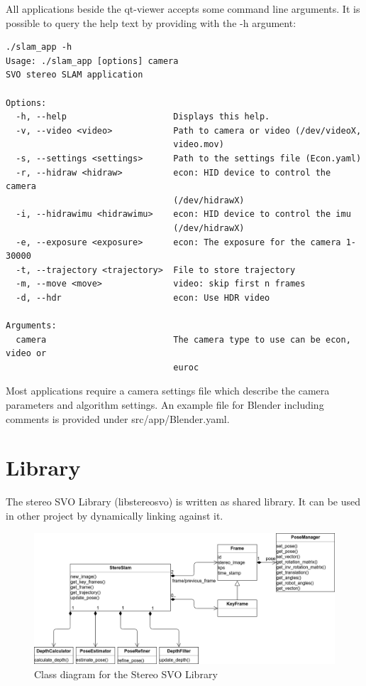 \documentclass[11pt,a4paper,titlepage,oneside]{report}
\begin{document}
All applications beside the qt-viewer accepts some command line arguments. It is possible to query the help text by providing with the -h argument:\\
\begin{lstlisting}
./slam_app -h
Usage: ./slam_app [options] camera
SVO stereo SLAM application

Options:
  -h, --help                     Displays this help.
  -v, --video <video>            Path to camera or video (/dev/videoX,
                                 video.mov)
  -s, --settings <settings>      Path to the settings file (Econ.yaml)
  -r, --hidraw <hidraw>          econ: HID device to control the camera
                                 (/dev/hidrawX)
  -i, --hidrawimu <hidrawimu>    econ: HID device to control the imu
                                 (/dev/hidrawX)
  -e, --exposure <exposure>      econ: The exposure for the camera 1-30000
  -t, --trajectory <trajectory>  File to store trajectory
  -m, --move <move>              video: skip first n frames
  -d, --hdr                      econ: Use HDR video

Arguments:
  camera                         The camera type to use can be econ, video or
                                 euroc
\end{lstlisting}

Most applications require a camera settings file which describe the camera parameters and algorithm settings. An example file for Blender including comments is provided under src/app/Blender.yaml.

\section{Library}

The stereo SVO Library (libstereosvo) is written as shared library. It can be used in other project by dynamically linking against it.
\begin{figure}[H]
  \centering
  \includegraphics[width=1.0\textwidth]{img/class_diagram.png}
  \caption{Class diagram for the Stereo SVO Library}\label{fig:class_diagram}
\end{figure}
\end{document}

